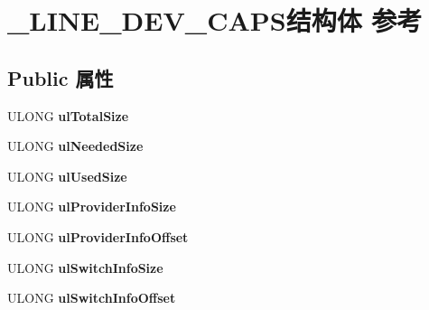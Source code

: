 \hypertarget{struct___l_i_n_e___d_e_v___c_a_p_s}{}\section{\+\_\+\+L\+I\+N\+E\+\_\+\+D\+E\+V\+\_\+\+C\+A\+P\+S结构体 参考}
\label{struct___l_i_n_e___d_e_v___c_a_p_s}
\subsection*{Public 属性}
\begin{DoxyCompactItemize}
\item 
\mbox{\label{struct___l_i_n_e___d_e_v___c_a_p_s_a04447405001abd7d34ad69222d14663a}} 
U\+L\+O\+NG {\bfseries ul\+Total\+Size}
\item 
\mbox{\label{struct___l_i_n_e___d_e_v___c_a_p_s_ab2cd789e9220cd99dbfee70f54a84744}} 
U\+L\+O\+NG {\bfseries ul\+Needed\+Size}
\item 
\mbox{\label{struct___l_i_n_e___d_e_v___c_a_p_s_a195caafb16707ef9481e0fe5f72d98a9}} 
U\+L\+O\+NG {\bfseries ul\+Used\+Size}
\item 
\mbox{\label{struct___l_i_n_e___d_e_v___c_a_p_s_a35a158a31515230a31250f9339fe39fa}} 
U\+L\+O\+NG {\bfseries ul\+Provider\+Info\+Size}
\item 
\mbox{\label{struct___l_i_n_e___d_e_v___c_a_p_s_a84a1b22c8e0c0371cb6b854f87e8a752}} 
U\+L\+O\+NG {\bfseries ul\+Provider\+Info\+Offset}
\item 
\mbox{\label{struct___l_i_n_e___d_e_v___c_a_p_s_a3367a518be2577d92993b759f248f3d5}} 
U\+L\+O\+NG {\bfseries ul\+Switch\+Info\+Size}
\item 
\mbox{\label{struct___l_i_n_e___d_e_v___c_a_p_s_a308c8c4316c454a04e0ef4a6d18b7803}} 
U\+L\+O\+NG {\bfseries ul\+Switch\+Info\+Offset}
\item 
\mbox{\label{struct___l_i_n_e___d_e_v___c_a_p_s_a9ffa5ad0b7707ce3dd01d2a2cc6f1eb2}} 

\end{DoxyCompactItemize}
